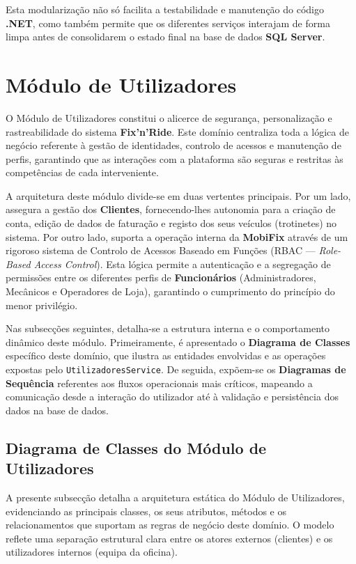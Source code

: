 \documentclass[a4paper,12pt]{scrreprt}
\begin{document}
Esta modularização não só facilita a testabilidade e manutenção do código \textbf{.NET}, como também permite que os diferentes serviços interajam de forma limpa antes de consolidarem o estado final na base de dados \textbf{SQL Server}.

\section{Módulo de Utilizadores}

O Módulo de Utilizadores constitui o alicerce de segurança, personalização e rastreabilidade do sistema \textbf{Fix'n'Ride}. Este domínio centraliza toda a lógica de negócio referente à gestão de identidades, controlo de acessos e manutenção de perfis, garantindo que as interações com a plataforma são seguras e restritas às competências de cada interveniente.

A arquitetura deste módulo divide-se em duas vertentes principais. Por um lado, assegura a gestão dos \textbf{Clientes}, fornecendo-lhes autonomia para a criação de conta, edição de dados de faturação e registo dos seus veículos (trotinetes) no sistema. Por outro lado, suporta a operação interna da \textbf{MobiFix} através de um rigoroso sistema de Controlo de Acessos Baseado em Funções (RBAC — \textit{Role-Based Access Control}). Esta lógica permite a autenticação e a segregação de permissões entre os diferentes perfis de \textbf{Funcionários} (Administradores, Mecânicos e Operadores de Loja), garantindo o cumprimento do princípio do menor privilégio.

Nas subsecções seguintes, detalha-se a estrutura interna e o comportamento dinâmico deste módulo. Primeiramente, é apresentado o \textbf{Diagrama de Classes} específico deste domínio, que ilustra as entidades envolvidas e as operações expostas pelo \texttt{UtilizadoresService}. De seguida, expõem-se os \textbf{Diagramas de Sequência} referentes aos fluxos operacionais mais críticos, mapeando a comunicação desde a interação do utilizador até à validação e persistência dos dados na base de dados.

\vskip 0.5cm

\subsection{Diagrama de Classes do Módulo de Utilizadores}

A presente subsecção detalha a arquitetura estática do Módulo de Utilizadores, evidenciando as principais classes, os seus atributos, métodos e os relacionamentos que suportam as regras de negócio deste domínio. O modelo reflete uma separação estrutural clara entre os atores externos (clientes) e os utilizadores internos (equipa da oficina).
\end{document}
